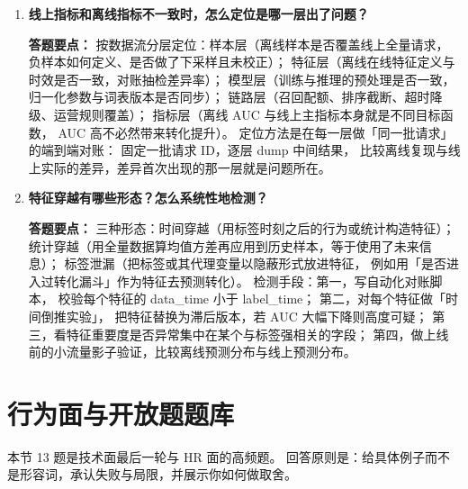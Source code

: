 \begin{interview}[题库与答题要点]
\begin{enumerate}[label=]
  \item[\textcolor{VioletDeep}{\textbf{Q130.}}] \textbf{线上指标和离线指标不一致时，怎么定位是哪一层出了问题？}
\par\smallskip\noindent\textcolor{VioletDeep}{\textbf{答题要点：}}
按数据流分层定位：样本层（离线样本是否覆盖线上全量请求，
负样本如何定义、是否做了下采样且未校正）；
特征层（离线在线特征定义与时效是否一致，对账抽检差异率）；
模型层（训练与推理的预处理是否一致，归一化参数与词表版本是否同步）；
链路层（召回配额、排序截断、超时降级、运营规则覆盖）；
指标层（离线 AUC 与线上主指标本身就是不同目标函数，
AUC 高不必然带来转化提升）。
定位方法是在每一层做「同一批请求」的端到端对账：
固定一批请求 ID，逐层 dump 中间结果，
比较离线复现与线上实际的差异，差异首次出现的那一层就是问题所在。

  \item[\textcolor{VioletDeep}{\textbf{Q131.}}] \textbf{特征穿越有哪些形态？怎么系统性地检测？}
\par\smallskip\noindent\textcolor{VioletDeep}{\textbf{答题要点：}}
三种形态：时间穿越（用标签时刻之后的行为或统计构造特征）；
统计穿越（用全量数据算均值方差再应用到历史样本，等于使用了未来信息）；
标签泄漏（把标签或其代理变量以隐蔽形式放进特征，
例如用「是否进入过转化漏斗」作为特征去预测转化）。
检测手段：第一，写自动化对账脚本，
校验每个特征的 data\_time 小于 label\_time；
第二，对每个特征做「时间倒推实验」，
把特征替换为滞后版本，若 AUC 大幅下降则高度可疑；
第三，看特征重要度是否异常集中在某个与标签强相关的字段；
第四，做上线前的小流量影子验证，比较离线预测分布与线上预测分布。

\end{enumerate}

\end{interview}

\section{行为面与开放题题库}

本节 13 题是技术面最后一轮与 HR 面的高频题。
回答原则是：给具体例子而不是形容词，承认失败与局限，并展示你如何做取舍。

